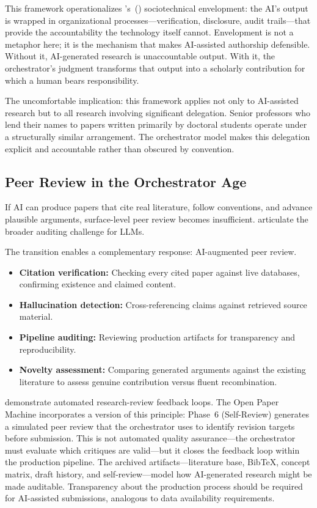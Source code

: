 \documentclass{article}
\begin{document}
This framework operationalizes \citeauthor{asatiani2021envelopment}'s~(\citeyear{asatiani2021envelopment}) sociotechnical envelopment: the AI's output is wrapped in organizational processes---verification, disclosure, audit trails---that provide the accountability the technology itself cannot. Envelopment is not a metaphor here; it is the mechanism that makes AI-assisted authorship defensible. Without it, AI-generated research is unaccountable output. With it, the orchestrator's judgment transforms that output into a scholarly contribution for which a human bears responsibility.

The uncomfortable implication: this framework applies not only to AI-assisted research but to all research involving significant delegation. Senior professors who lend their names to papers written primarily by doctoral students operate under a structurally similar arrangement. The orchestrator model makes this delegation explicit and accountable rather than obscured by convention.


\subsection{Peer Review in the Orchestrator Age}

If AI can produce papers that cite real literature, follow conventions, and advance plausible arguments, surface-level peer review becomes insufficient. \citet{mokander2023auditing} articulate the broader auditing challenge for LLMs.

The transition enables a complementary response: AI-augmented peer review.

\begin{itemize}
  \item \textbf{Citation verification:} Checking every cited paper against live databases, confirming existence and claimed content.
  \item \textbf{Hallucination detection:} Cross-referencing claims against retrieved source material.
  \item \textbf{Pipeline auditing:} Reviewing production artifacts for transparency and reproducibility.
  \item \textbf{Novelty assessment:} Comparing generated arguments against the existing literature to assess genuine contribution versus fluent recombination.
\end{itemize}

\citet{weng2024cycleresearcher} demonstrate automated research-review feedback loops. The Open Paper Machine incorporates a version of this principle: Phase~6 (Self-Review) generates a simulated peer review that the orchestrator uses to identify revision targets before submission. This is not automated quality assurance---the orchestrator must evaluate which critiques are valid---but it closes the feedback loop within the production pipeline. The archived artifacts---literature base, BibTeX, concept matrix, draft history, and self-review---model how AI-generated research might be made auditable. Transparency about the production process should be required for AI-assisted submissions, analogous to data availability requirements.
\end{document}

